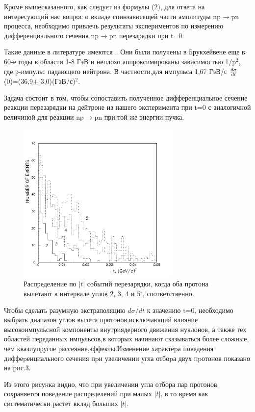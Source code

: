 \documentclass[a4paper,12pt]{article}
\begin{document}
Кроме вышесказанного, как следует из формулы (2), для ответа на интересующий нас
вопрос о вкладе спинзависящей части амплитуды np$\to$pn процесса, необходимо
привлечь результаты экспериментов по измерению дифференциального сечения
np$\to$pn перезарядки при t=0.

Такие данные в литературе имеются~\cite{Fri}. Они были получены в Брукхейвене
еще в 60-е годы в области 1-8 ГэВ и неплохо аппроксимированы зависимостью
1/p$^2$, где р-импульс падающего нейтрона. В частности,для импульса 1,67 ГэВ/с
${d\sigma\over dt}$(0)=(36,9$\pm$ 3,0)(ГэВ/с)$^2$.

Задача состоит в том, чтобы сопоставить полученное дифференциальное сечение
реакции перезарядки на дейтроне из нашего эксперимента при t=0 с аналогичной
величиной для реакции np$\to$pn при той же энергии пучка.

\begin{figure}[h]
  \begin{center}
    \includegraphics[width=8cm]{tpp2345.pdf}
    \caption {Распределение по $\vert t \vert$ событий перезарядки, когда оба
      протона вылетают в интервале углов 2, 3, 4 и 5$^\circ$, соответственно.}
  \end{center}
\end{figure}

Чтобы сделать разумную экстраполяцию $d\sigma/dt$ к значению t=0, необходимо
выбрать диапазон углов вылета протонов,исключающий влияние высокоимпульсной
компоненты внутриядерного движения нуклонов, а также тех областей переданных
импульсов,в которых начинают сказываться более сложные, чем квазиупругое
рассеяние,эффекты.Изменение хаpактеpа поведения диффеpенциального сечения пpи
увеличении угла отбоpа двух пpотонов показано на pис.3.

Из этого рисунка видно, что при увеличении угла отбора пар протонов сохраняется
поведение распределений при малых $\vert t \vert$, в то время как систематически
растет вклад больших $\vert t \vert$.
\end{document}
